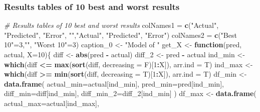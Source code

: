 \documentclass[
]{article}
\newenvironment{Shaded}{\begin{snugshade}}{\end{snugshade}}
\newcommand{\CommentTok}[1]{\textcolor[rgb]{0.56,0.35,0.01}{\textit{#1}}}
\newcommand{\ControlFlowTok}[1]{\textcolor[rgb]{0.13,0.29,0.53}{\textbf{#1}}}
\newcommand{\DataTypeTok}[1]{\textcolor[rgb]{0.13,0.29,0.53}{#1}}
\newcommand{\DecValTok}[1]{\textcolor[rgb]{0.00,0.00,0.81}{#1}}
\newcommand{\KeywordTok}[1]{\textcolor[rgb]{0.13,0.29,0.53}{\textbf{#1}}}
\newcommand{\NormalTok}[1]{#1}
\newcommand{\OperatorTok}[1]{\textcolor[rgb]{0.81,0.36,0.00}{\textbf{#1}}}
\newcommand{\StringTok}[1]{\textcolor[rgb]{0.31,0.60,0.02}{#1}}
\begin{document}
\hypertarget{results-tables-of-10-best-and-worst-results}{%
\subsubsection{Results tables of 10 best and worst
results}\label{results-tables-of-10-best-and-worst-results}}

\label{show-table-10}

\begin{Shaded}
\begin{Highlighting}[]
\CommentTok{# Results tables of 10 best and worst results}
\NormalTok{colNames1 =}\StringTok{ }\KeywordTok{c}\NormalTok{(}\StringTok{"Actual"}\NormalTok{, }\StringTok{"Predicted"}\NormalTok{, }\StringTok{"Error"}\NormalTok{, }\StringTok{""}\NormalTok{,}\StringTok{"Actual"}\NormalTok{, }\StringTok{"Predicted"}\NormalTok{, }\StringTok{"Error"}\NormalTok{) }
\NormalTok{colNames2 =}\StringTok{ }\KeywordTok{c}\NormalTok{(}\StringTok{"Best 10"}\NormalTok{=}\DecValTok{3}\NormalTok{,}\StringTok{""}\NormalTok{, }\StringTok{"Worst 10"}\NormalTok{=}\DecValTok{3}\NormalTok{) }
\NormalTok{caption_}\DecValTok{0}\NormalTok{ <-}\StringTok{ "Model of "}
\NormalTok{get_X <-}\StringTok{ }\ControlFlowTok{function}\NormalTok{(pred, actual, }\DataTypeTok{X=}\DecValTok{10}\NormalTok{)\{}
\NormalTok{  diff <-}\StringTok{ }\KeywordTok{abs}\NormalTok{(pred }\OperatorTok{-}\StringTok{ }\NormalTok{actual)}
\NormalTok{  diff_}\DecValTok{2}\NormalTok{ <-}\StringTok{ }\NormalTok{pred }\OperatorTok{-}\StringTok{ }\NormalTok{actual}
\NormalTok{  ind_min <-}\StringTok{ }\KeywordTok{which}\NormalTok{(diff }\OperatorTok{<=}\StringTok{ }\KeywordTok{max}\NormalTok{(}\KeywordTok{sort}\NormalTok{(diff, }\DataTypeTok{decreasing =}\NormalTok{ F)[}\DecValTok{1}\OperatorTok{:}\NormalTok{X]), }\DataTypeTok{arr.ind =}\NormalTok{ T)}
\NormalTok{  ind_max <-}\StringTok{ }\KeywordTok{which}\NormalTok{(diff }\OperatorTok{>=}\StringTok{ }\KeywordTok{min}\NormalTok{(}\KeywordTok{sort}\NormalTok{(diff, }\DataTypeTok{decreasing =}\NormalTok{ T)[}\DecValTok{1}\OperatorTok{:}\NormalTok{X]), }\DataTypeTok{arr.ind =}\NormalTok{ T)}
\NormalTok{  df_min <-}\StringTok{ }\KeywordTok{data.frame}\NormalTok{(}
    \DataTypeTok{actual_min=}\NormalTok{actual[ind_min],}
    \DataTypeTok{pred_min=}\NormalTok{pred[ind_min],}
    \DataTypeTok{diff_min=}\NormalTok{diff[ind_min],}
    \DataTypeTok{diff_min_2=}\NormalTok{diff_}\DecValTok{2}\NormalTok{[ind_min]}
\NormalTok{  )}
\NormalTok{  df_max <-}\StringTok{ }\KeywordTok{data.frame}\NormalTok{(}
    \DataTypeTok{actual_max=}\NormalTok{actual[ind_max],}

\end{Highlighting}
\end{Shaded}
\end{document}

